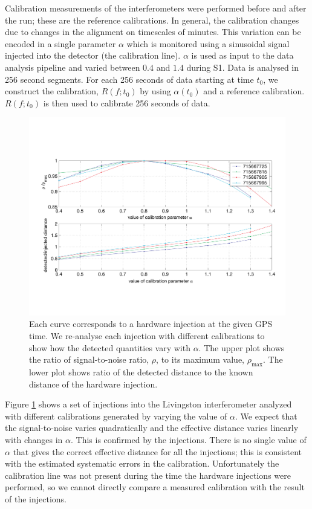 Calibration measurements of the interferometers were performed before and
after the run; these are the reference calibrations. In general, the
calibration changes due to changes in the alignment on timescales of minutes.
This variation can be encoded in a single parameter $\alpha$ which is
monitored using a sinusoidal signal injected into the
detector (the calibration line)\cite{adhikari2003}. $\alpha$ is used as input
to the data analysis pipeline and varied between $0.4$ and $1.4$ during S1.
Data is analysed in 256 second segments.  For each 256 seconds of data
starting at time $t_0$, we construct the calibration, $R(f;t_0)$ by using
$\alpha(t_0)$ and a reference calibration.  $R(f;t_0)$ is then used to
calibrate 256 seconds of data.

\begin{figure}[htb]
  \vspace{5pt}
  \begin{flushright}
    \includegraphics[width=\textwidth]{figures/hardware/calibration}    
  \end{flushright}
  \caption{%
  Each curve corresponds to a hardware injection at the given GPS time. We
  re-analyse each injection with different calibrations to show how the
  detected quantities vary with $\alpha$. The upper plot shows the ratio of
  signal-to-noise ratio, $\rho$, to its maximum value, $\rho_{\mathrm{max}}$.
  The lower plot shows ratio of the detected distance to the known distance of
  the hardware injection.
  }
\label{f:calibration}
\end{figure}
Figure \ref{f:calibration} shows a set of injections into the Livingston
interferometer analyzed with different calibrations generated by varying the
value of $\alpha$. We expect that the signal-to-noise varies quadratically and
the effective distance varies linearly with changes in $\alpha$\cite{bruce}.
This is confirmed by the injections.  There is no single value of $\alpha$
that gives the correct effective distance for all the injections; this is
consistent with the estimated systematic errors in the calibration.
Unfortunately the calibration line was not present during the time the
hardware injections were performed, so we cannot directly compare a measured
calibration with the result of the injections.
